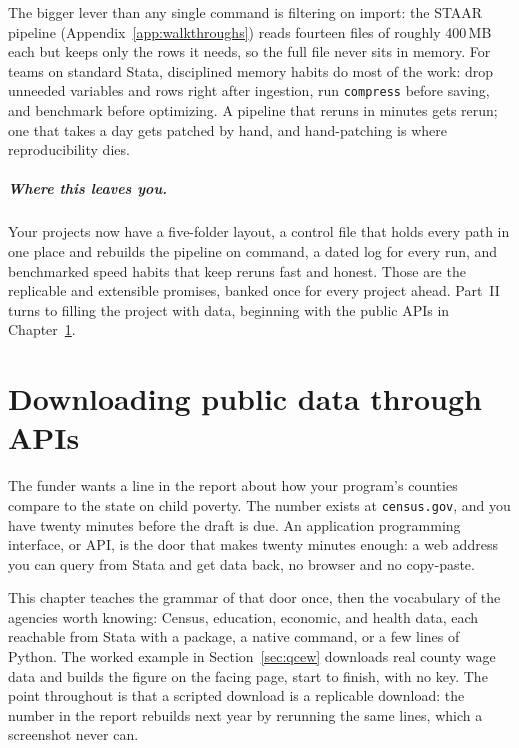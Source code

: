 \documentclass[
    a4paper,
    fontsize=10pt,
    twoside=true,
    numbers=noenddot,
]{kaobook}
\begin{document}
The bigger lever than any single command is filtering on import: the STAAR pipeline (Appendix~\ref{app:walkthroughs}) reads fourteen files of roughly 400\,MB each but keeps only the rows it needs, so the full file never sits in memory. For teams on standard Stata, disciplined memory habits do most of the work: drop unneeded variables and rows right after ingestion, run \texttt{compress} before saving, and benchmark before optimizing. A pipeline that reruns in minutes gets rerun; one that takes a day gets patched by hand, and hand-patching is where reproducibility dies.

\paragraph{Where this leaves you.} Your projects now have a five-folder layout, a control file that holds every path in one place and rebuilds the pipeline on command, a dated log for every run, and benchmarked speed habits that keep reruns fast and honest. Those are the replicable and extensible promises, banked once for every project ahead. Part~II turns to filling the project with data, beginning with the public APIs in Chapter~\ref{ch:apis}.



\chapter{Downloading public data through APIs}\label{ch:apis}

The funder wants a line in the report about how your program's counties compare to the state on child poverty. The number exists at \texttt{census.gov}, and you have twenty minutes before the draft is due. An application programming interface, or API, is the door that makes twenty minutes enough: a web address you can query from Stata and get data back, no browser and no copy-paste.

This chapter teaches the grammar of that door once, then the vocabulary of the agencies worth knowing: Census, education, economic, and health data, each reachable from Stata with a package, a native command, or a few lines of Python. The worked example in Section~\ref{sec:qcew} downloads real county wage data and builds the figure on the facing page, start to finish, with no key. The point throughout is that a scripted download is a replicable download: the number in the report rebuilds next year by rerunning the same lines, which a screenshot never can.
\end{document}

